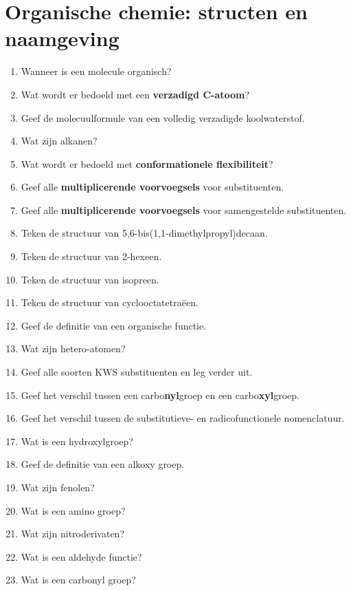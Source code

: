 \documentclass[a4paper,12pt]{article}
\begin{document}
    \section{Organische chemie: structen en naamgeving}
    \begin{enumerate}
        \item Wanneer is een molecule organisch?
        \item Wat wordt er bedoeld met een \textbf{verzadigd C-atoom}?
        \item Geef de molecuulformule van een volledig verzadigde koolwaterstof.
        \item Wat zijn alkanen?
        \item Wat wordt er bedoeld met \textbf{conformationele flexibiliteit}?
        \item Geef alle \textbf{multiplicerende voorvoegsels} voor substituenten.
        \item Geef alle \textbf{multiplicerende voorvoegsels} voor samengestelde substituenten.
        \item Teken de structuur van 5,6-bis(1,1-dimethylpropyl)decaan.
        \item Teken de structuur van 2-hexeen.
        \item Teken de structuur van isopreen.
        \item Teken de structuur van cyclooctatetra\"een.
        \item Geef de definitie van een organische functie.
        \item Wat zijn hetero-atomen?
        \item Geef alle soorten KWS substituenten en leg verder uit.
        \item Geef het verschil tussen een carbo\textbf{nyl}groep en een carbo\textbf{xyl}groep.
        \item Geef het verschil tussen de substitutieve- en radicofunctionele nomenclatuur.
        \item Wat is een hydroxylgroep?
        \item Geef de definitie van een alkoxy groep.
        \item Wat zijn fenolen?
        \item Wat is een amino groep?
        \item Wat zijn nitroderivaten?
        \item Wat is een aldehyde functie?
        \item Wat is een carbonyl groep?
    \end{enumerate}
\end{document}
